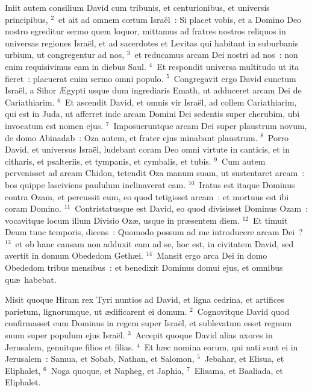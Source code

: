\bchapter
\lettrine[lines=3,image=true,loversize=0.05,lraise=-0.03]{I}{}niit autem consilium David cum tribunis, et centurionibus, et universis principibus,
${}^{2}$~et ait ad omnem cœtum Isra\"el~: Si placet vobis, et a Domino Deo nostro egreditur sermo quem loquor, mittamus ad fratres nostros reliquos in universas regiones Isra\"el, et ad sacerdotes et Levitas qui habitant in suburbanis urbium, ut congregentur ad nos,
${}^{3}$~et reducamus arcam Dei nostri ad nos~: non enim requisivimus eam in diebus Saul.
${}^{4}$~Et respondit universa multitudo ut ita fieret~: placuerat enim sermo omni populo.
${}^{5}$~Congregavit ergo David cunctum Isra\"el, a Sihor \AE gypti usque dum ingrediaris Emath, ut adduceret arcam Dei de Cariathiarim.
${}^{6}$~Et ascendit David, et omnis vir Isra\"el, ad collem Cariathiarim, qui est in Juda, ut afferret inde arcam Domini Dei sedentis super cherubim, ubi invocatum est nomen ejus.
${}^{7}$~Imposueruntque arcam Dei super plaustrum novum, de domo Abinadab~: Oza autem, et frater ejus minabant plaustrum.
${}^{8}$~Porro David, et universus Isra\"el, ludebant coram Deo omni virtute in canticis, et in citharis, et psalteriis, et tympanis, et cymbalis, et tubis.
${}^{9}$~Cum autem pervenisset ad aream Chidon, tetendit Oza manum suam, ut sustentaret arcam~: bos quippe lasciviens paululum inclinaverat eam.
${}^{10}$~Iratus est itaque Dominus contra Ozam, et percussit eum, eo quod tetigisset arcam~: et mortuus est ibi coram Domino.
${}^{11}$~Contristatusque est David, eo quod divisisset Dominus Ozam~: vocavitque locum illum Divisio Oz\ae , usque in pr\ae sentem diem.
${}^{12}$~Et timuit Deum tunc temporis, dicens~: Quomodo possum ad me introducere arcam Dei~?
${}^{13}$~et ob hanc causam non adduxit eam ad se, hoc est, in civitatem David, sed avertit in domum Obededom Geth\ae i.
${}^{14}$~Mansit ergo arca Dei in domo Obededom tribus mensibus~: et benedixit Dominus domui ejus, et omnibus qu\ae\ habebat.

\bchapter
\lettrine[lines=3,image=true,loversize=0.05,lraise=-0.03]{M}{}isit quoque Hiram rex Tyri nuntios ad David, et ligna cedrina, et artifices parietum, lignorumque, ut \ae dificarent ei domum.
${}^{2}$~Cognovitque David quod confirmasset eum Dominus in regem super Isra\"el, et sublevatum esset regnum suum super populum ejus Isra\"el.
${}^{3}$~Accepit quoque David alias uxores in Jerusalem, genuitque filios et filias.
${}^{4}$~Et h\ae c nomina eorum, qui nati sunt ei in Jerusalem~: Samua, et Sobab, Nathan, et Salomon,
${}^{5}$~Jebahar, et Elisua, et Eliphalet,
${}^{6}$~Noga quoque, et Napheg, et Japhia,
${}^{7}$~Elisama, et Baaliada, et Eliphalet.


